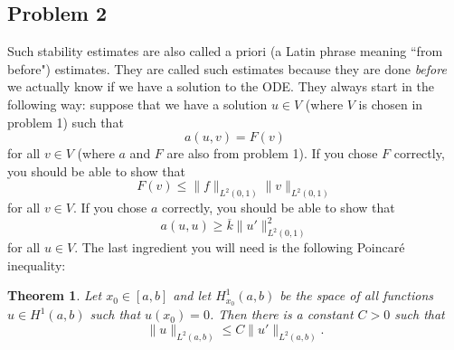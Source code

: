 \documentclass{article}
\theoremstyle{definition}
\theoremstyle{plain}
\newtheorem{theorem}{Theorem}
\begin{document}
\subsection{Problem 2}
Such stability estimates are also called a priori (a Latin phrase meaning ``from before") estimates.
They are called such estimates because they are done \emph{before} we actually know if we have a solution to the ODE.
They always start in the following way: suppose that we have a solution $u \in V$ (where $V$ is chosen in problem 1) such that 
\begin{equation}
    a(u,v) = F(v)
\end{equation}
for all $v \in V$ (where $a$ and $F$ are also from problem 1).
If you chose $F$ correctly, you should be able to show that 
\begin{equation}
    F(v) \leq \|f\|_{L^2(0,1)}\|v\|_{L^2(0,1)}
\end{equation}
for all $v \in V$.
If you chose $a$ correctly, you should be able to show that 
\begin{equation}
    a(u,u) \geq \overline k \|u'\|_{L^2(0,1)}^2
\end{equation}
for all $u \in V$.
The last ingredient you will need is the following Poincar\'e inequality:
\begin{theorem}
    Let $x_0 \in [a,b]$ and let $H^1_{x_0}(a,b)$ be the space of all functions $u \in H^1(a,b)$ such that $u(x_0) = 0$.
    Then there is a constant $C > 0$ such that 
    \begin{equation}
        \|u\|_{L^2(a,b)} \leq C\|u'\|_{L^2(a,b)}.
    \end{equation}
\end{theorem}
\end{document}
